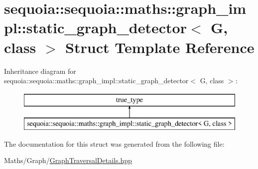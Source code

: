 \hypertarget{structsequoia_1_1sequoia_1_1maths_1_1graph__impl_1_1static__graph__detector}{}\section{sequoia\+::sequoia\+::maths\+::graph\+\_\+impl\+::static\+\_\+graph\+\_\+detector$<$ G, class $>$ Struct Template Reference}
\label{structsequoia_1_1sequoia_1_1maths_1_1graph__impl_1_1static__graph__detector}
Inheritance diagram for sequoia\+::sequoia\+::maths\+::graph\+\_\+impl\+::static\+\_\+graph\+\_\+detector$<$ G, class $>$\+:\begin{figure}[H]
\begin{center}
\leavevmode
\includegraphics[height=2.000000cm]{structsequoia_1_1sequoia_1_1maths_1_1graph__impl_1_1static__graph__detector}
\end{center}
\end{figure}


The documentation for this struct was generated from the following file\+:\begin{DoxyCompactItemize}
\item 
Maths/\+Graph/\mbox{\hyperlink{_graph_traversal_details_8hpp}{Graph\+Traversal\+Details.\+hpp}}\end{DoxyCompactItemize}
